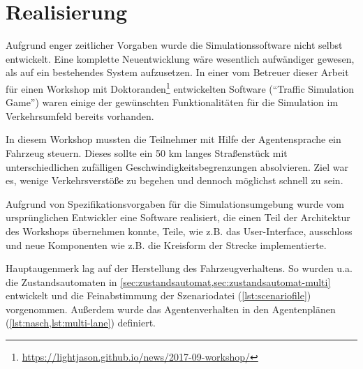 \section{Realisierung}
\label{sec:realisierung}

Aufgrund enger zeitlicher Vorgaben wurde die Simulationssoftware nicht selbst entwickelt.
Eine komplette Neuentwicklung wäre wesentlich aufwändiger gewesen, als auf ein bestehendes System aufzusetzen.
In einer vom Betreuer dieser Arbeit für einen Workshop mit Doktoranden\footnote{\url{https://lightjason.github.io/news/2017-09-workshop/}} entwickelten Software (\enquote{Traffic Simulation Game}) waren einige der gewünschten Funktionalitäten für die Simulation im Verkehrsumfeld bereits vorhanden.


In diesem Workshop mussten die Teilnehmer mit Hilfe der Agentensprache ein Fahrzeug steuern. Dieses sollte ein 50 km langes Straßenstück mit unterschiedlichen zufälligen Geschwindigkeitsbegrenzungen absolvieren. Ziel war es, wenige Verkehrsverstöße zu begehen und dennoch möglichst schnell zu sein.

Aufgrund von Spezifikationsvorgaben für die Simulationsumgebung wurde vom ursprünglichen Entwickler eine Software realisiert, die einen Teil der Architektur des Workshops übernehmen konnte, Teile, wie z.B. das User-Interface, ausschloss und neue Komponenten wie z.B. die Kreisform der Strecke implementierte.

Hauptaugenmerk lag auf der Herstellung des Fahrzeugverhaltens.
So wurden u.a. die Zustandsautomaten in \cref{sec:zustandsautomat,sec:zustandsautomat-multi} entwickelt und die Feinabstimmung der Szenariodatei (\cref{lst:scenariofile}) vorgenommen.
Außerdem wurde das Agentenverhalten in den Agentenplänen (\cref{lst:nasch,lst:multi-lane}) definiert.

